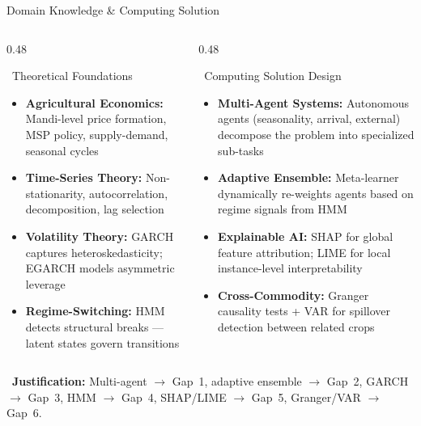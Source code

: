 \documentclass{beamer}
\begin{document}
\begin{frame}[label=domain]{Domain Knowledge \& Computing Solution}

\begin{columns}[T]
\begin{column}{0.48\textwidth}
\begin{infocard}{~Theoretical Foundations}
\scriptsize
\begin{itemize}\setlength\itemsep{1.5pt}
\item[\faIcon{seedling}] \textbf{Agricultural Economics:} Mandi-level price formation, MSP policy, supply-demand, seasonal cycles
\item[\faIcon{chart-area}] \textbf{Time-Series Theory:} Non-stationarity, autocorrelation, decomposition, lag selection
\item[\faIcon{wave-square}] \textbf{Volatility Theory:} GARCH captures heteroskedasticity; EGARCH models asymmetric leverage
\item[\faIcon{random}] \textbf{Regime-Switching:} HMM detects structural breaks --- latent states govern transitions
\end{itemize}
\end{infocard}
\end{column}
\begin{column}{0.48\textwidth}
\begin{purplecard}{~Computing Solution Design}
\scriptsize
\begin{itemize}\setlength\itemsep{1.5pt}
\item[\faIcon{robot}] \textbf{Multi-Agent Systems:} Autonomous agents (seasonality, arrival, external) decompose the problem into specialized sub-tasks
\item[\faIcon{layer-group}] \textbf{Adaptive Ensemble:} Meta-learner dynamically re-weights agents based on regime signals from HMM
\item[\faIcon{search}] \textbf{Explainable AI:} SHAP for global feature attribution; LIME for local instance-level interpretability
\item[\faIcon{link}] \textbf{Cross-Commodity:} Granger causality tests + VAR for spillover detection between related crops
\end{itemize}
\end{purplecard}
\end{column}
\end{columns}

\vspace{0.06cm}

\begin{tcolorbox}[enhanced, colback=warmyellow!8, colframe=warmyellow!60, arc=5pt,
  boxrule=0.3pt, left=6pt, right=6pt, top=3pt, bottom=3pt,
  shadow={1pt}{-1pt}{0pt}{black!10}]
\centering\scriptsize
{}~\textbf{Justification:} Multi-agent $\to$ Gap~1, adaptive ensemble $\to$ Gap~2, GARCH $\to$ Gap~3, HMM $\to$ Gap~4, SHAP/LIME $\to$ Gap~5, Granger/VAR $\to$ Gap~6.
\end{tcolorbox}

\end{frame}
\end{document}
